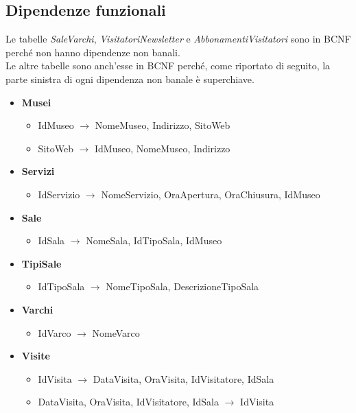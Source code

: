 \documentclass[a4paper, 12pt]{article}
\begin{document}
\subsection{Dipendenze funzionali}
Le tabelle \textit{SaleVarchi}, \textit{VisitatoriNewsletter} e \textit{AbbonamentiVisitatori} sono in BCNF perché non hanno dipendenze non banali.
\\Le altre tabelle sono anch'esse in BCNF perché, come riportato di seguito, la parte sinistra di ogni dipendenza non banale è superchiave.
\begin{itemize}
    \item \textbf{Musei}
        \begin{itemize}
            \item IdMuseo $\rightarrow$ NomeMuseo, Indirizzo, SitoWeb
            \item SitoWeb $\rightarrow$ IdMuseo, NomeMuseo, Indirizzo
        \end{itemize}
    \item \textbf{Servizi} 
        \begin{itemize}
            \item IdServizio $\rightarrow$ NomeServizio, OraApertura, OraChiusura, IdMuseo
        \end{itemize}
    \item \textbf{Sale} 
        \begin{itemize}
            \item IdSala $\rightarrow$ NomeSala, IdTipoSala, IdMuseo
        \end{itemize}
    \item \textbf{TipiSale} 
        \begin{itemize}
            \item IdTipoSala $\rightarrow$ NomeTipoSala, DescrizioneTipoSala
        \end{itemize}
    \item \textbf{Varchi} 
        \begin{itemize}
            \item IdVarco $\rightarrow$ NomeVarco
        \end{itemize}
    \item \textbf{Visite} 
        \begin{itemize}
            \item IdVisita $\rightarrow$ DataVisita, OraVisita, IdVisitatore, IdSala
            \item DataVisita, OraVisita, IdVisitatore, IdSala $\rightarrow$ IdVisita
        \end{itemize}

\end{itemize}
\end{document}
